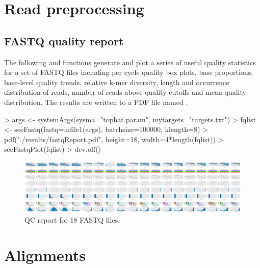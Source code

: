 \documentclass{article}
\begin{document}
\section{Read preprocessing}
\subsection{FASTQ quality report}
The following  and  functions generate and plot a series of
useful quality statistics for a set of FASTQ files including per cycle quality
box plots, base proportions, base-level quality trends, relative k-mer
diversity, length and occurrence distribution of reads, number of reads above
quality cutoffs and mean quality distribution. The results are written to a PDF file named 
\href{run:./results/fastqReport.pdf}{}.

\begin{Schunk}
\begin{Sinput}
> args <- systemArgs(sysma="tophat.param", mytargets="targets.txt")
> fqlist <- seeFastq(fastq=infile1(args), batchsize=100000, klength=8)
> pdf("./results/fastqReport.pdf", height=18, width=4*length(fqlist))
> seeFastqPlot(fqlist)
> dev.off()
\end{Sinput}
\end{Schunk}
\begin{figure}[H]
  \centering
   \includegraphics[width=18cm]{fastqReport.pdf}
   \caption{QC report for 18 FASTQ files.}
   \label{fig:fastqreport}
\end{figure}

\section{Alignments}
\end{document}
